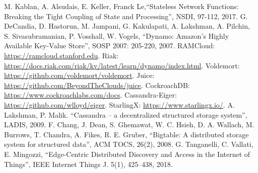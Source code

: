 \documentclass[conference]{IEEEtran}
\begin{document}
\begin{thebibliography}{00}
 M. Kablan, A. Alsudais, E. Keller, Franck Le,``Stateless Network Functions: Breaking the Tight Coupling of State and Processing'', NSDI, 97-112, 2017.
 G. DeCandia, D. Hastorun, M. Jampani, G. Kakulapati, A. Lakshman, A. Pilchin, S. Sivasubramanian, P. Vosshall, W. Vogels, ``Dynamo: Amazon's Highly Available Key-Value Store'', SOSP 2007: 205-220, 2007.
 RAMCloud: \url{https://ramcloud.stanford.edu}.
 Riak: \url{https://docs.riak.com/riak/kv/latest/learn/dynamo/index.html}.
 Voldemort: \url{https://github.com/voldemort/voldemort}.
 Juice: \url{https://github.com/BeyondTheClouds/juice}.
 CockroachDB: \url{https://www.cockroachlabs.com/docs}.
 Cassandra-Eiger: \url{https://github.com/wlloyd/eiger}.
 StarlingX: \url{https://www.starlingx.io/}.
 A. Lakshman, P. Malik. ``Cassandra – a decentralized structured storage system'', LADIS, 2009.
 F. Chang, J. Dean, S. Ghemawat, W. C. Hsieh, D. A. Wallach, M. Burrows, T. Chandra, A. Fikes, R. E. Gruber, ``Bigtable: A distributed storage system for structured data'', ACM TOCS, 26(2), 2008.
 G. Tanganelli, C. Vallati, E. Mingozzi, ``Edge-Centric Distributed Discovery and Access in the Internet of Things'', IEEE Internet Things J. 5(1), 425–438, 2018.
\end{thebibliography}
\end{document}
